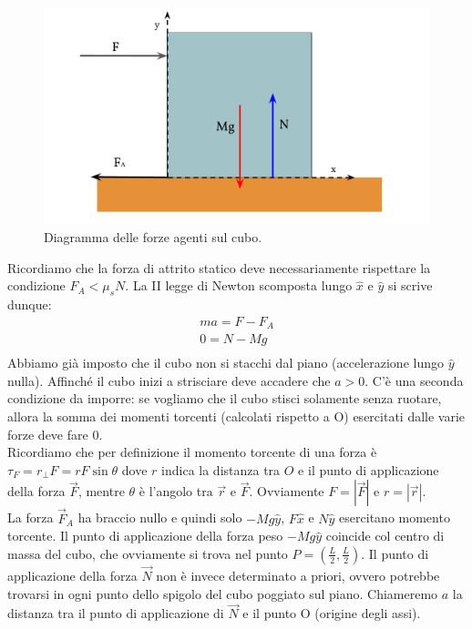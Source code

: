 \documentclass[12pt,a4paper]{book}
\begin{document}
\begin{figure}[!ht]
 \centering
\includegraphics[scale=0.45]{cubo2.pdf}
\caption{Diagramma delle forze agenti sul cubo. \label{fig:cubo2} }
\end{figure}
Ricordiamo che la forza di attrito statico deve necessariamente rispettare la condizione $F_A<\mu_s N$.
La II legge di Newton scomposta lungo $\hat{x}$ e $\hat{y}$ si scrive dunque:
%
\begin{gather*}
ma=F-F_A \\
0=N-Mg\\
\end{gather*}
%
Abbiamo già imposto che il cubo non si stacchi dal piano (accelerazione lungo $\hat{y}$ nulla). Affinché il cubo inizi a strisciare deve accadere che $a>0$. C'è una seconda condizione da imporre: se vogliamo che il cubo stisci solamente senza ruotare, allora la somma dei momenti torcenti (calcolati rispetto a O) esercitati dalle varie forze deve fare 0. \\

Ricordiamo che per definizione il momento torcente di una forza è $\tau_F=r_{\perp}F=rF\sin \theta$ dove $r$ indica la distanza tra $O$ e il punto di applicazione della forza $\vec{F}$, mentre $\theta$ è l'angolo tra $\vec{r}$ e $\vec{F}$. Ovviamente $F=|\vec{F}|$ e $r=|\vec{r}|$.\\

La forza $\vec{F}_A$ ha braccio nullo e quindi solo $-Mg\hat{y}$,  $F\hat{x}$ e $N\hat{y}$ esercitano momento torcente. Il punto di applicazione della forza peso $-Mg\hat{y}$ coincide col centro di massa del cubo, che ovviamente si trova nel punto $P=(\frac{L}{2},\frac{L}{2})$. 
Il punto di applicazione della forza $\vec{N}$ non è invece determinato a priori, ovvero potrebbe trovarsi in ogni punto dello spigolo del cubo poggiato sul piano.  Chiameremo $a$ la distanza tra il punto di applicazione di $\vec{N}$ e il punto O (origine degli assi).\\
\end{document}
